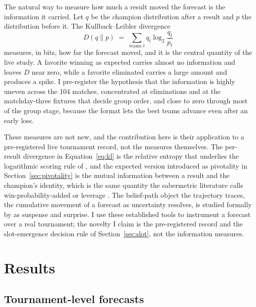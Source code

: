 \documentclass[11pt,letterpaper]{article}
\begin{document}
The natural way to measure how much a result moved the forecast is the information it carried. Let $q$ be the champion distribution after a result and $p$ the distribution before it. The Kullback--Leibler divergence
\begin{equation}
D(q \parallel p) \;=\; \sum_{\text{teams } t} q_t \log_2 \frac{q_t}{p_t}
\label{eq:kl}
\end{equation}
measures, in bits, how far the forecast moved, and it is the central quantity of the live study. A favorite winning as expected carries almost no information and leaves $D$ near zero, while a favorite eliminated carries a large amount and produces a spike. I pre-register the hypothesis that the information is highly uneven across the 104 matches, concentrated at eliminations and at the matchday-three fixtures that decide group order, and close to zero through most of the group stage, because the format lets the best teams advance even after an early loss.

These measures are not new, and the contribution here is their application to a pre-registered live tournament record, not the measures themselves. The per-result divergence in Equation~\eqref{eq:kl} is the relative entropy that underlies the logarithmic scoring rule of \citet{gneiting2007}, and the expected version introduced as pivotality in Section~\ref{sec:pivotality} is the mutual information between a result and the champion's identity, which is the same quantity the sabermetric literature calls win-probability-added or leverage \citep{tango2007}. The belief-path object the trajectory traces, the cumulative movement of a forecast as uncertainty resolves, is studied formally by \citet{ely2015} as suspense and surprise. I use these established tools to instrument a forecast over a real tournament; the novelty I claim is the pre-registered record and the slot-emergence decision rule of Section~\ref{sec:slot}, not the information measures.

\section{Results}

\subsection{Tournament-level forecasts}
\end{document}
